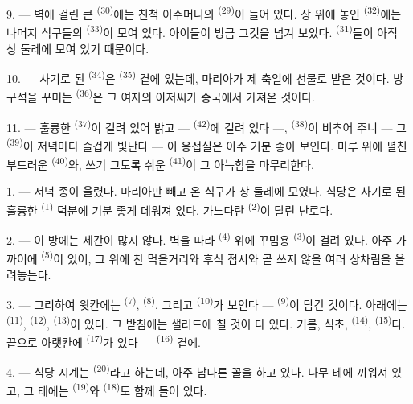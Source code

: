 9. --- 벽에 걸린 큰  \textsuperscript{(30)}에는 친척 아주머니의
 \textsuperscript{(29)}이 들어 있다. 상 위에 놓인 
\textsuperscript{(32)}에는 나머지 식구들의  \textsuperscript{(33)}이 모여 있다.
아이들이 방금 그것을 넘겨 보았다.  \textsuperscript{(31)}들이 아직 상 둘레에
모여 있기 때문이다.

10. --- 사기로 된  \textsuperscript{(34)}은 
\textsuperscript{(35)} 곁에 있는데, 마리아가 제 축일에 선물로 받은 것이다. 방 구석을
꾸미는  \textsuperscript{(36)}은 그 여자의 아저씨가 중국에서 가져온 것이다.

11. --- 훌륭한  \textsuperscript{(37)}이 걸려 있어 밝고 — 
\textsuperscript{(42)}에 걸려 있다 —,  \textsuperscript{(38)}이 비추어 주니
— 그  \textsuperscript{(39)}이 저녁마다 즐겁게 빛난다 — 이 응접실은 아주
기분 좋아 보인다. 마루 위에 펼친 부드러운  \textsuperscript{(40)}와, 쓰기
그토록 쉬운  \textsuperscript{(41)}이 그 아늑함을 마무리한다.

\VUsaut{3.6mm}
\VUsaut{3.0mm}

1. --- 저녁 종이 울렸다. 마리아만 빼고 온 식구가 상 둘레에 모였다. 식당은 사기로 된
훌륭한  \textsuperscript{(1)} 덕분에 기분 좋게 데워져 있다. 가느다란
 \textsuperscript{(2)}이 달린 난로다.

2. --- 이 방에는 세간이 많지 않다. 벽을 따라  \textsuperscript{(4)} 위에
꾸밈용  \textsuperscript{(3)}이 걸려 있다. 아주 가까이에 
\textsuperscript{(5)}이 있어, 그 위에 찬 먹을거리와 후식 접시와 곧 쓰지 않을 여러
상차림을 올려놓는다.

3. --- 그리하여 윗칸에는  \textsuperscript{(7)}, 
\textsuperscript{(8)}, 그리고  \textsuperscript{(10)}가 보인다 —
 \textsuperscript{(9)}이 담긴 것이다. 아래에는 
\textsuperscript{(11)},  \textsuperscript{(12)}, 
\textsuperscript{(13)}이 있다. 그 받침에는 샐러드에 칠 것이 다 있다. 기름, 식초,
 \textsuperscript{(14)},  \textsuperscript{(15)}다. 끝으로 아랫칸에
 \textsuperscript{(17)}가 있다 —  \textsuperscript{(16)}
곁에.

4. --- 식당 시계는  \textsuperscript{(20)}라고 하는데, 아주 남다른 꼴을
하고 있다. 나무 테에 끼워져 있고, 그 테에는  \textsuperscript{(19)}와
 \textsuperscript{(18)}도 함께 들어 있다.

